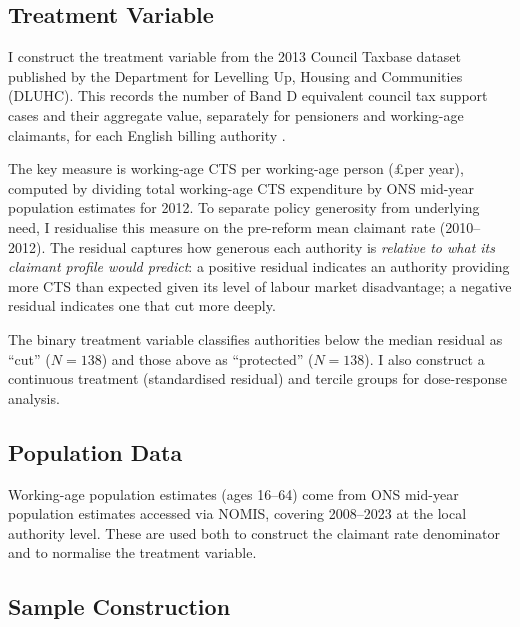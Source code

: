 \documentclass[12pt]{article}
\begin{document}
\subsection{Treatment Variable}

I construct the treatment variable from the 2013 Council Taxbase dataset published by the Department for Levelling Up, Housing and Communities (DLUHC). This records the number of Band D equivalent council tax support cases and their aggregate value, separately for pensioners and working-age claimants, for each English billing authority \citep{dluhc2013taxbase}.

The key measure is working-age CTS per working-age person (\pounds per year), computed by dividing total working-age CTS expenditure by ONS mid-year population estimates for 2012. To separate policy generosity from underlying need, I residualise this measure on the pre-reform mean claimant rate (2010--2012). The residual captures how generous each authority is \emph{relative to what its claimant profile would predict}: a positive residual indicates an authority providing more CTS than expected given its level of labour market disadvantage; a negative residual indicates one that cut more deeply.

The binary treatment variable classifies authorities below the median residual as ``cut'' ($N = 138$) and those above as ``protected'' ($N = 138$). I also construct a continuous treatment (standardised residual) and tercile groups for dose-response analysis.

\subsection{Population Data}

Working-age population estimates (ages 16--64) come from ONS mid-year population estimates accessed via NOMIS, covering 2008--2023 at the local authority level. These are used both to construct the claimant rate denominator and to normalise the treatment variable.

\subsection{Sample Construction}
\end{document}
